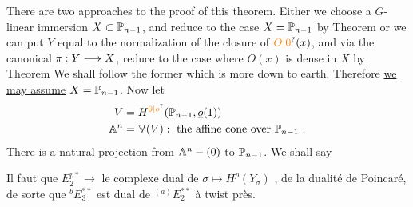 There are two approaches to the proof of this theorem. Either we choose a $G$-linear immersion $X\subset\mathbb{P}_{n-1}$, and reduce to the case $X=\mathbb{P}_{n-1}$ by Theorem  or we can put $Y$ equal to the normalization of the closure of $\unsure{O|0}(x)$, and via the canonical $\pi:Y\longrightarrow X$, reduce to the case where $O(x)$ is dense in $X$ by Theorem  We shall follow the former which is more down to earth. Therefore \uline{we may assume} $X=\mathbb{P}_{n-1}$. Now let
\[
\begin{aligned}
V&=H^{\unsure{0|o}}(\handwritten{\mathbb{P}_{n-1}},\underline{o}(1))\\
\handwritten{\mathbb{A}}^{n}&=\handwritten{\mathbb{V}}(V):\text{ the affine cone over }\handwritten{\mathbb{P}_{n-1}}\ .
\end{aligned}
\]
There is a natural projection from $\mathbb{A}^{n}-(0)$ to $\mathbb{P}_{n-1}$. We shall say

Il faut  que $E_2^{p*}\longrightarrow$  le  complexe dual de  $\sigma\mapsto H^p(Y_\sigma)$ ,   de la dualité de Poincaré, de sorte que  ${}^{b}E_3^{**}$ est dual de ${}^{(a)}E_2^{**}$ à twist près.

